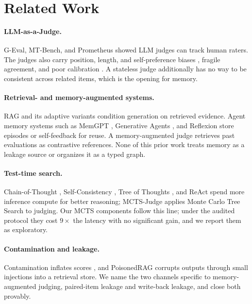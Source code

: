 \documentclass[11pt]{article}
\begin{document}
\section{Related Work}

\paragraph{LLM-as-a-Judge.} G-Eval, MT-Bench, and Prometheus \citep{geval2023, mt_bench2023, prometheus2023} showed LLM judges can track human raters. The judges also carry position, length, and self-preference biases \citep{llm_judge_bias2024, position_bias2024}, fragile agreement, and poor calibration \citep{chateval2023, llm_judge_agreement2024, judge_calibration2024}. A stateless judge additionally has no way to be consistent across related items, which is the opening for memory.

\paragraph{Retrieval- and memory-augmented systems.} RAG \citep{rag_original2020} and its adaptive variants \citep{active_rag2023, self_rag2023} condition generation on retrieved evidence. Agent memory systems such as MemGPT \citep{memgpt2023}, Generative Agents \citep{generative_agents2023}, and Reflexion \citep{reflexion2023} store episodes or self-feedback for reuse. A memory-augmented judge retrieves past evaluations as contrastive references. None of this prior work treats memory as a leakage source or organizes it as a typed graph.

\paragraph{Test-time search.} Chain-of-Thought \citep{chain_of_thought2022}, Self-Consistency \citep{self_consistency2023}, Tree of Thoughts \citep{tree_of_thoughts2023}, and ReAct \citep{react2023} spend more inference compute for better reasoning; MCTS-Judge \citep{mcts_judge2025} applies Monte Carlo Tree Search \citep{uct2006, mcts_survey2012} to judging. Our MCTS components follow this line; under the audited protocol they cost $9\times$ the latency with no significant gain, and we report them as exploratory.

\paragraph{Contamination and leakage.} Contamination inflates scores \citep{data_contamination2024, benchmark_contamination2024, eval_leakage2024}, and PoisonedRAG \citep{rag_poisoning2024} corrupts outputs through small injections into a retrieval store. We name the two channels specific to memory-augmented judging, paired-item leakage and write-back leakage, and close both provably.
\end{document}
